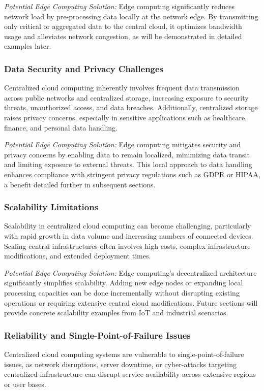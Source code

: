 \documentclass[runningheads]{llncs}
\begin{document}
\textit{Potential Edge Computing Solution:} Edge computing significantly reduces network load by pre-processing data locally at the network edge. By transmitting only critical or aggregated data to the central cloud, it optimizes bandwidth usage and alleviates network congestion, as will be demonstrated in detailed examples later.

\subsubsection{Data Security and Privacy Challenges}
Centralized cloud computing inherently involves frequent data transmission across public networks and centralized storage, increasing exposure to security threats, unauthorized access, and data breaches. Additionally, centralized storage raises privacy concerns, especially in sensitive applications such as healthcare, finance, and personal data handling.

\textit{Potential Edge Computing Solution:} Edge computing mitigates security and privacy concerns by enabling data to remain localized, minimizing data transit and limiting exposure to external threats. This local approach to data handling enhances compliance with stringent privacy regulations such as GDPR or HIPAA, a benefit detailed further in subsequent sections.

\subsubsection{Scalability Limitations}
Scalability in centralized cloud computing can become challenging, particularly with rapid growth in data volume and increasing numbers of connected devices. Scaling central infrastructures often involves high costs, complex infrastructure modifications, and extended deployment times.

\textit{Potential Edge Computing Solution:} Edge computing's decentralized architecture significantly simplifies scalability. Adding new edge nodes or expanding local processing capacities can be done incrementally without disrupting existing operations or requiring extensive central cloud modifications. Future sections will provide concrete scalability examples from IoT and industrial scenarios.

\subsubsection{Reliability and Single-Point-of-Failure Issues}
Centralized cloud computing systems are vulnerable to single-point-of-failure issues, as network disruptions, server downtime, or cyber-attacks targeting centralized infrastructure can disrupt service availability across extensive regions or user bases.
\end{document}
